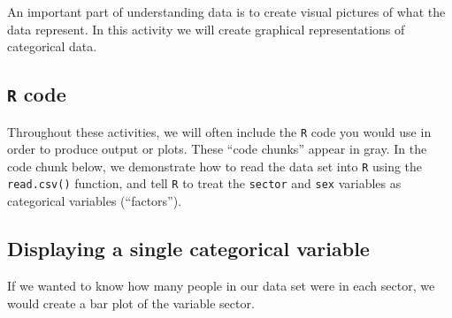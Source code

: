 \documentclass[
]{report}
\newenvironment{Shaded}{\begin{snugshade}}{\end{snugshade}}
\newcommand{\CommentTok}[1]{\textcolor[rgb]{0.56,0.35,0.01}{\textit{#1}}}
\newcommand{\KeywordTok}[1]{\textcolor[rgb]{0.13,0.29,0.53}{\textbf{#1}}}
\newcommand{\NormalTok}[1]{#1}
\newcommand{\OperatorTok}[1]{\textcolor[rgb]{0.81,0.36,0.00}{\textbf{#1}}}
\newcommand{\StringTok}[1]{\textcolor[rgb]{0.31,0.60,0.02}{#1}}
\begin{document}
\vspace{0.5in}

An important part of understanding data is to create visual pictures of what the data represent. In this activity we will create graphical representations of categorical data.

\hypertarget{r-code}{%
\subsection{\texorpdfstring{\texttt{R} code}{R code}}\label{r-code}}

Throughout these activities, we will often include the \texttt{R} code
you would use in order to produce output or plots. These
``code chunks'' appear in gray. In the code chunk below, we
demonstrate how to read the data set into \texttt{R} using the \texttt{read.csv()} function, and tell \texttt{R} to treat the \texttt{sector} and \texttt{sex} variables as categorical variables (``factors'').

\begin{Shaded}
\end{Shaded}

\newpage

\hypertarget{displaying-a-single-categorical-variable}{%
\subsection{Displaying a single categorical variable}\label{displaying-a-single-categorical-variable}}

If we wanted to know how many people in our data set were in each sector, we would create a bar plot of the variable sector.
\end{document}
